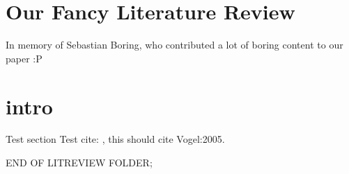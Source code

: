 \section{Our Fancy Literature Review}
In memory of Sebastian Boring, who contributed a lot of boring content to our paper :P
\section{intro}
Test section
Test cite: \cite{Vogel:2005} , this should cite Vogel:2005.

END OF LITREVIEW FOLDER;